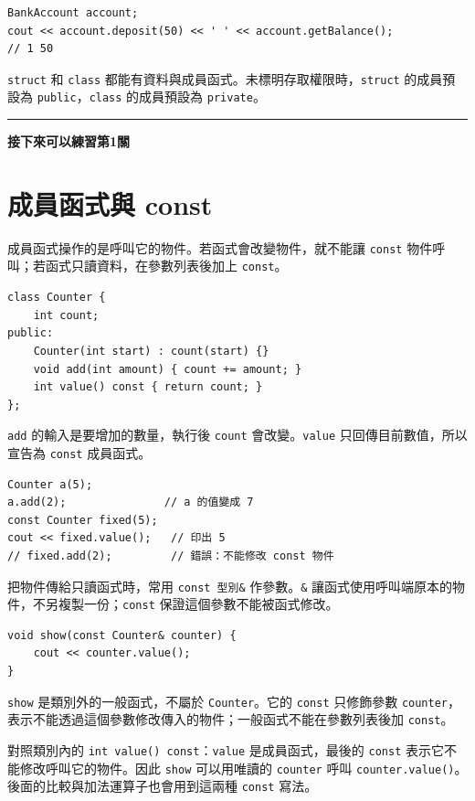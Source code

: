 \documentclass[12pt,a4paper]{article}
\newcommand{\practice}[1]{%
  \Needspace{3\baselineskip}%
  \par\vspace{0.6em}\noindent\rule{\linewidth}{0.3pt}\par
  \noindent\textbf{接下來可以練習第#1關}\par
}
\begin{document}
\begin{lstlisting}
BankAccount account;
cout << account.deposit(50) << ' ' << account.getBalance();
// 1 50
\end{lstlisting}

\texttt{struct} 和 \texttt{class} 都能有資料與成員函式。未標明存取權限時，\texttt{struct} 的成員預設為 \texttt{public}，\texttt{class} 的成員預設為 \texttt{private}。

\practice{1}

\section{成員函式與 const}

成員函式操作的是呼叫它的物件。若函式會改變物件，就不能讓 \texttt{const} 物件呼叫；若函式只讀資料，在參數列表後加上 \texttt{const}。

\begin{lstlisting}
class Counter {
    int count;
public:
    Counter(int start) : count(start) {}
    void add(int amount) { count += amount; }
    int value() const { return count; }
};
\end{lstlisting}

\texttt{add} 的輸入是要增加的數量，執行後 \texttt{count} 會改變。\texttt{value} 只回傳目前數值，所以宣告為 \texttt{const} 成員函式。

\begin{lstlisting}
Counter a(5);
a.add(2);               // a 的值變成 7
const Counter fixed(5);
cout << fixed.value();   // 印出 5
// fixed.add(2);         // 錯誤：不能修改 const 物件
\end{lstlisting}

把物件傳給只讀函式時，常用 \texttt{const 型別\&} 作參數。\texttt{\&} 讓函式使用呼叫端原本的物件，不另複製一份；\texttt{const} 保證這個參數不能被函式修改。

\begin{lstlisting}
void show(const Counter& counter) {
    cout << counter.value();
}
\end{lstlisting}

\texttt{show} 是類別外的一般函式，不屬於 \texttt{Counter}。它的 \texttt{const} 只修飾參數 \texttt{counter}，表示不能透過這個參數修改傳入的物件；一般函式不能在參數列表後加 \texttt{const}。

對照類別內的 \texttt{int value() const}：\texttt{value} 是成員函式，最後的 \texttt{const} 表示它不能修改呼叫它的物件。因此 \texttt{show} 可以用唯讀的 \texttt{counter} 呼叫 \texttt{counter.value()}。後面的比較與加法運算子也會用到這兩種 \texttt{const} 寫法。
\end{document}
